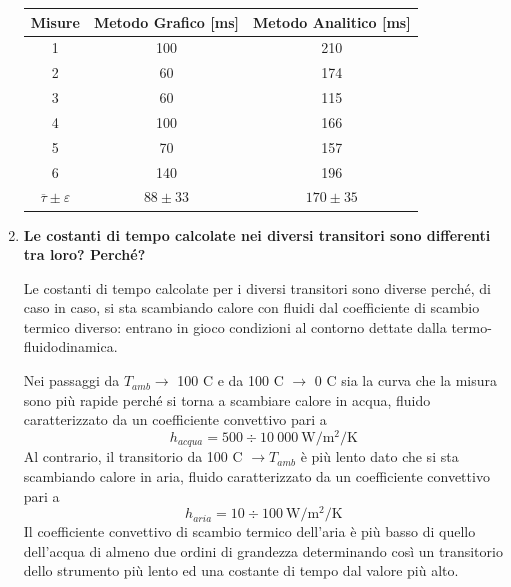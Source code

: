 \documentclass[a4paper, 12pt, twoside]{report}
\newcommand{\ra}[1]{\renewcommand{\arraystretch}{#1}} %
\begin{document}
\begin{enumerate}
\begin{table}[H]
			\end{table}
			
			\begin{table}[H]
				\centering
				\ra{1.3}
				\label{tab:title3} 
					\begin{tabular}{ccc}
						\toprule
						 \textbf{Misure}                         & \textbf{Metodo Grafico} [ms]  & \textbf{Metodo Analitico} [ms] \\  \midrule
						1                               & 100                  & 210                    \\ 
						2                               & 60                   & 174                    \\ 
						3                               & 60                   & 115                    \\ 
						4                               & 100                  & 166                    \\ 
						5                               & 70                   & 157                    \\ 
						6                               & 140                  & 196                    \\ 
						$\overline{\tau}\pm\varepsilon$ & $ 88\pm33  $         & $ 170\pm35  $          \\ \bottomrule
					\end{tabular}				
			\end{table}

		\item \textbf{Le costanti di tempo calcolate nei diversi transitori sono differenti tra loro? Perché?} \newline
		
		Le costanti di tempo calcolate per i diversi transitori sono diverse perché, di caso in caso, si sta scambiando calore con fluidi dal coefficiente di scambio termico diverso: entrano in gioco condizioni al contorno dettate dalla termo-fluidodinamica. \newline
		
		Nei passaggi da $ T_{amb} \rightarrow $ 100 \degree C e da 100 \degree C $\rightarrow$ 0 \degree C sia la curva che la misura sono più rapide perché si torna a scambiare calore in acqua, fluido caratterizzato da un coefficiente convettivo pari a		
		\[h_{acqua} = 500\div10~000~\unit{\watt\per\square\meter\per\kelvin}\]		
		Al contrario, il transitorio da 100 \degree C $\rightarrow T_{amb}$ è più lento dato che si sta scambiando calore in aria, fluido caratterizzato da un coefficiente convettivo pari a 		
		\[h_{aria} = 10\div100~\unit{\watt\per\square\meter\per\kelvin}  \]		
		Il coefficiente convettivo di scambio termico dell’aria è più basso di quello dell’acqua di almeno due ordini di grandezza determinando così un transitorio dello strumento più lento ed una costante di tempo dal valore più alto.
		

\end{enumerate}
\end{document}
